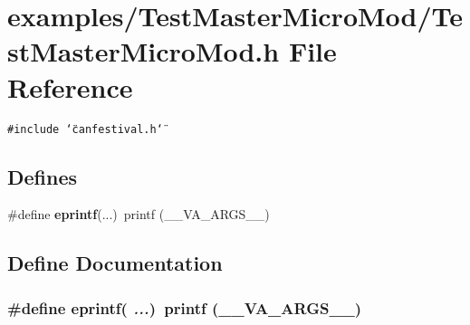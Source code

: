 \section{examples/Test\-Master\-Micro\-Mod/Test\-Master\-Micro\-Mod.h File Reference}
\label{TestMasterMicroMod_8h}
{\tt \#include \char`\"{}canfestival.h\char`\"{}}\par
\subsection*{Defines}
\begin{CompactItemize}
\item 
\#define {\bf eprintf}(...)~printf (\_\-\_\-VA\_\-ARGS\_\-\_\-)
\end{CompactItemize}


\subsection{Define Documentation}
\subsubsection{\setlength{\rightskip}{0pt plus 5cm}\#define eprintf( {\em ...})~printf (\_\-\_\-VA\_\-ARGS\_\-\_\-)}\label{TestMasterMicroMod_8h_82f06ace20f96f70bc165247e69fac57}


